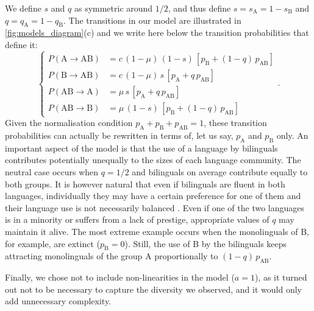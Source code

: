 \documentclass[../thesis.tex]{subfiles}
\begin{document}
We define $s$ and $q$ as symmetric around $1/2$, and thus define $s = s_\text{A} = 1 -
s_\text{B}$ and $q = q_\text{A} = 1 - q_\text{B}$. The transitions in our model are
illustrated in \cref{fig:models_diagram}(c) and we write here below the transition
probabilities that define it:
\begin{equation}
\label{eq:bipref_model}
\left\{
\begin{aligned}
  P (\text{A} \rightarrow \text{AB}) &= c \, (1 - \mu) \, (1-s) \, \left[ p_{\text{B}} + (1-q) \,  p_{\text{AB}} \right] \\
  P (\text{B} \rightarrow \text{AB}) &= c \, (1 - \mu) \, s \, \left[ p_{\text{A}} + q \, p_{\text{AB}} \right] \\
  P (\text{AB} \rightarrow \text{A}) &= \mu \, s \, \left[ p_{\text{A}} + q \, p_{\text{AB}} \right] \\
  P (\text{AB} \rightarrow \text{B}) &= \mu \, (1-s) \, \left[ p_{\text{B}} + (1-q) \, p_{\text{AB}} \right]
\end{aligned}
\right. .
\end{equation}
Given the normalisation condition $p_\text{A} + p_\text{B} + p_\text{AB} = 1$, these
transition probabilities can actually be rewritten in terms of, let us say, $p_\text{A}$
and $p_\text{B}$ only. An important aspect of the model is that the use of a language by
bilinguals contributes potentially unequally to the sizes of each language community.
The neutral case occurs when $q = 1/2$ and bilinguals on average contribute equally to
both groups. It is however natural that even if bilinguals are fluent in both languages,
individually they may have a certain preference for one of them and their language use
is not necessarily balanced \cite{RomaineBilingualMultilingual2012}. Even if one of the
two languages is in a minority or suffers from a lack of prestige, appropriate values of
$q$ may maintain it alive. The most extreme example occurs when the monolinguals of B,
for example, are extinct ($p_{\text{B}} = 0$). Still, the use of B by the bilinguals
keeps attracting monolinguals of the group A proportionally to $(1-q)\, p_{\text{AB}}$.

Finally, we chose not to include non-linearities in the model ($a = 1$), as it turned
out not to be necessary to capture the diversity we observed, and it would only add
unnecessary complexity.
\end{document}
